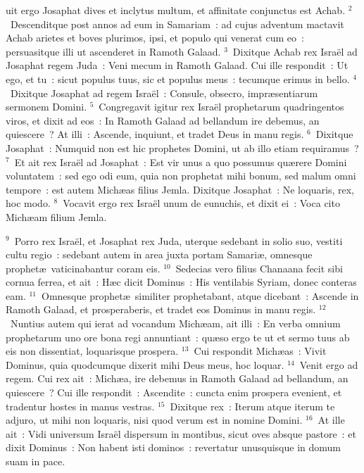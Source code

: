 \bchapter
{}uit ergo Josaphat dives et inclytus multum, et affinitate conjunctus est Achab.
${}^{2}$~Descenditque post annos ad eum in Samariam~: ad cujus adventum mactavit Achab arietes et boves plurimos, ipsi, et populo qui venerat cum eo~: persuasitque illi ut ascenderet in Ramoth Galaad.
${}^{3}$~Dixitque Achab rex Isra\"el ad Josaphat regem Juda~: Veni mecum in Ramoth Galaad. Cui ille respondit~: Ut ego, et tu~: sicut populus tuus, sic et populus meus~: tecumque erimus in bello.
${}^{4}$~Dixitque Josaphat ad regem Isra\"el~: Consule, obsecro, impr\ae sentiarum sermonem Domini.
${}^{5}$~Congregavit igitur rex Isra\"el prophetarum quadringentos viros, et dixit ad eos~: In Ramoth Galaad ad bellandum ire debemus, an quiescere~? At illi~: Ascende, inquiunt, et tradet Deus in manu regis.
${}^{6}$~Dixitque Josaphat~: Numquid non est hic prophetes Domini, ut ab illo etiam requiramus~?
${}^{7}$~Et ait rex Isra\"el ad Josaphat~: Est vir unus a quo possumus qu\ae rere Domini voluntatem~: sed ego odi eum, quia non prophetat mihi bonum, sed malum omni tempore~: est autem Mich\ae as filius Jemla. Dixitque Josaphat~: Ne loquaris, rex, hoc modo.
${}^{8}$~Vocavit ergo rex Isra\"el unum de eunuchis, et dixit ei~: Voca cito Mich\ae am filium Jemla.


${}^{9}$~Porro rex Isra\"el, et Josaphat rex Juda, uterque sedebant in solio suo, vestiti cultu regio~: sedebant autem in area juxta portam Samari\ae , omnesque prophet\ae\ vaticinabantur coram eis.
${}^{10}$~Sedecias vero filius Chanaana fecit sibi cornua ferrea, et ait~: H\ae c dicit Dominus~: His ventilabis Syriam, donec conteras eam.
${}^{11}$~Omnesque prophet\ae\ similiter prophetabant, atque dicebant~: Ascende in Ramoth Galaad, et prosperaberis, et tradet eos Dominus in manu regis.
${}^{12}$~Nuntius autem qui ierat ad vocandum Mich\ae am, ait illi~: En verba omnium prophetarum uno ore bona regi annuntiant~: qu\ae so ergo te ut et sermo tuus ab eis non dissentiat, loquarisque prospera.
${}^{13}$~Cui respondit Mich\ae as~: Vivit Dominus, quia quodcumque dixerit mihi Deus meus, hoc loquar.
${}^{14}$~Venit ergo ad regem. Cui rex ait~: Mich\ae a, ire debemus in Ramoth Galaad ad bellandum, an quiescere~? Cui ille respondit~: Ascendite~: cuncta enim prospera evenient, et tradentur hostes in manus vestras.
${}^{15}$~Dixitque rex~: Iterum atque iterum te adjuro, ut mihi non loquaris, nisi quod verum est in nomine Domini.
${}^{16}$~At ille ait~: Vidi universum Isra\"el dispersum in montibus, sicut oves absque pastore~: et dixit Dominus~: Non habent isti dominos~: revertatur unusquisque in domum suam in pace.


